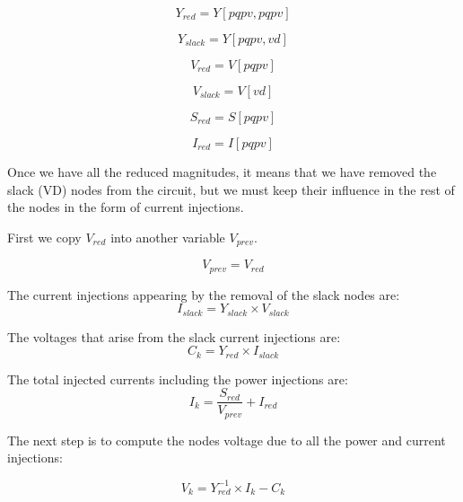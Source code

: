 \documentclass[a4paper,twoside]{tufte-book}
\begin{document}
\begin{equation}
Y_{red} = Y[pqpv, pqpv]
\end{equation}

\begin{equation}
Y_{slack} = Y[pqpv, vd]
\end{equation}

\begin{equation}
V_{red} = V[pqpv]
\end{equation}

\begin{equation}
V_{slack} = V[vd]
\end{equation}

\begin{equation}
S_{red} = S[pqpv]
\end{equation}

\begin{equation}
I_{red} = I[pqpv]
\end{equation}


Once we have all the reduced magnitudes, it means that we have removed the slack (VD) nodes from the circuit, but we must keep their influence in the rest of the nodes in the form of current injections.

First we copy $V_{red}$ into another variable $V_{prev}$.

\begin{equation}
V_{prev} = V_{red}
\end{equation}

The current injections appearing by the removal of the slack nodes are:
\begin{equation}
I_{slack} = Y_{slack} \times V_{slack}
\end{equation}

The voltages that arise from the slack current injections are:
\begin{equation}
C_k = Y_{red} \times I_{slack}
\end{equation}

The total injected currents including the power injections are:
\begin{equation}
I_k = \frac{S_{red}}{V_{prev}} + I_{red}
\label{eq:zm_ik}
\end{equation}

The next step is to compute the nodes voltage due to all the power and current injections:

\begin{equation}
V_k = Y_{red}^{-1} \times I_k - C_k
\end{equation}
\end{document}
